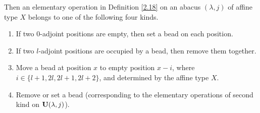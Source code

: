 \documentclass[11pt]{amsart}
\theoremstyle{plain}
\numberwithin{equation}{subsection}
\newcommand{\lam}{\lambda}
\begin{document}
Then an elementary operation in Definition \ref{2.18} on an abacus $(\lam, j)$ of affine type $X$ belongs to one of the following four kinds.
\begin{enumerate}
  \item [\rm (1)] If two $0$-adjoint positions are empty, then set a bead on each position.
  \item [\rm (2)] If two $l$-adjoint positions are occupied by a bead, then remove them together.
  \item [\rm (3)] Move a bead at position $x$ to empty position $x-i$, 
  where $i\in \{l+1, 2l, 2l+1, 2l+2\}$, and determined by the affine type $X$.
  \item [\rm (4)] Remove or set a bead (corresponding to the elementary operations of second kind on ${\rm \bf U}(\lam, j)$).
\end{enumerate}
\end{document}
